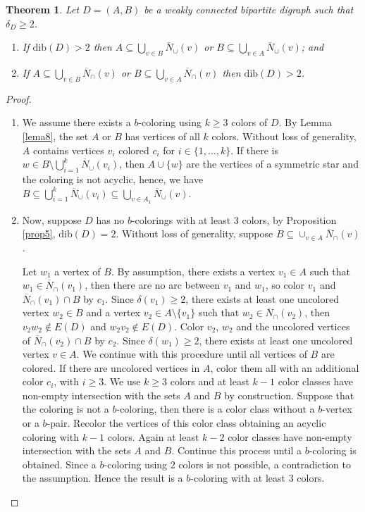 \documentclass[12pt]{article}
\newtheorem{theorem}{Theorem}
\begin{document}
\begin{theorem}\label{teo10}
Let $D=(A, B)$ be a weakly connected bipartite digraph such that $\delta_D\geq 2$.
\begin{enumerate}
\item If $\text{dib}(D)>2$ then $A \subseteq \bigcup _{v\in B} \overline{N}_{\cup}(v)$ or $B \subseteq \bigcup _{v\in A} \overline{N}_{\cup}(v)$; and
    
\item If $A \subseteq \bigcup _{v\in B} \overline{N}_{\cap}(v)$ or $B \subseteq \bigcup _{v\in A} \overline{N}_{\cap}(v)$ then $\text{dib}(D)>2$.
\end{enumerate}
\end{theorem}
\begin{proof}
\begin{enumerate}

\item We assume there exists a $b$-coloring using $k\geq 3$ colors of $D$. By Lemma \ref{lema8}, the set $A$ or $B$ has vertices of all $k$ colors. Without loss of generality, $A$ contains vertices $v_i$ colored $c_i$ for $i\in\{1,\dots,k\}$. If there is $w\in B\setminus \bigcup _{i=1}^{k} \overline{N}_{\cup}(v_i)$, then $A\cup \{w\}$ are the vertices of a symmetric star and the coloring is not acyclic, hence, we have $B \subseteq \bigcup _{i=1}^{k} \overline{N}_{\cup}(v_i)\subseteq \bigcup _{v\in A_1} \overline{N}_{\cup}(v)$.

\item Now, suppose $D$ has no $b$-colorings with at least $3$ colors, by Proposition \ref{prop5}, $\text{dib}(D)=2$. Without loss of generality, suppose $B \subseteq \cup_{v\in A} \overline{N}_{\cap}(v)$. 

Let $w_1$ a vertex of $B$. By assumption, there exists a vertex $v_1 \in A$ such that $w_1\in \overline{N}_{\cap}(v_1)$, then there are no arc between $v_1$ and $w_1$, so color $v_1$ and $\overline{N}_{\cap}(v_1)\cap B$ by $c_1$. Since $\delta(v_1)\geq 2$, there exists at least one uncolored vertex $w_2 \in B$ and a vertex $v_2 \in A \setminus \{v_1\}$ such that $w_2\in \overline{N}_{\cap}(v_2)$, then $v_2w_2 \notin E(D)$ and $w_2v_2 \notin E(D)$. Color $v_2$, $w_2$ and the uncolored vertices of $\overline{N}_{\cap}(v_2) \cap B$ by $c_2$. Since $\delta(w_1)\geq 2$, there exists at least one uncolored vertex $v \in A$. We continue with this procedure  %
until all vertices of $B$ are colored. If there are uncolored vertices in $A$, color them all with an additional color $c_i$, with $i\geq 3$. 
We use $k\geq 3$ colors and at least $k-1$ color classes have non-empty intersection with the sets $A$ and $B$ by construction. 
Suppose that the coloring is not a $b$-coloring, then there is a color class without a $b$-vertex or a $b$-pair. Recolor the vertices of this color class obtaining an acyclic coloring with $k-1$ colors. Again at least $k-2$ color classes have non-empty intersection with the sets $A$ and $B$. Continue this process until a $b$-coloring
is obtained. Since a $b$-coloring using $2$ colors is not possible, a contradiction to the assumption. Hence the result is a $b$-coloring with at least $3$ colors.


\end{enumerate}
\end{proof}
\end{document}
